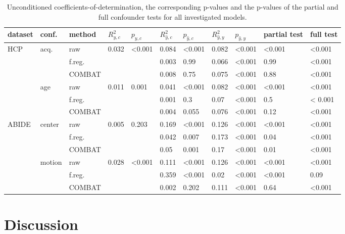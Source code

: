 \documentclass{article}
\begin{document}
\renewcommand{\arraystretch}{1.2}
\begin{table}
\centering
\begin{tabular}{lll|ll|ll|ll|ll} 
dataset & conf. & method & $R^2_{y, c}$ & $p_{y, c}$ & $R^2_{\hat{y}, c}$ & $p_{\hat{y}, c}$ & $R^2_{\hat{y}, y}$ & $p_{\hat{y}, y}$ & partial test & full test  \\
\hline
HCP & acq.  & raw      & 0.032 & <0.001 & 0.084 & <0.001  & 0.082 & <0.001 & <0.001 & <0.001 \\
    &              & f.reg.    & & &0.003 & 0.99 & 0.066  & <0.001  & 0.99 & <0.001 \\
    &              & COMBAT    & & &0.008 & 0.75 & 0.075  & <0.001  & 0.88 & <0.001\\
\hline
    & age   & raw       & 0.011 & 0.001  & 0.041 & <0.001  & 0.082  & <0.001 & <0.001 & <0.001 \\
    &       & f.reg.    & & &0.001 & 0.3 & 0.07  & <0.001  & 0.5 & <    0.001 \\
    &       & COMBAT    & & &0.004 & 0.055 & 0.076 & <0.001 & 0.12 & <0.001 \\
\hline
ABIDE   & center   & raw       & 0.005  & 0.203 &  0.169 & <0.001& 0.126     & <0.001 & <0.001 & <0.001 \\
        &          & f.reg.    &  & &  0.042 & 0.007 & 0.173     & <0.001 & 0.04 & <0.001 \\
        &          & COMBAT    &  & &  0.05 & 0.001 & 0.17     & <0.001 & 0.01 & <0.001 \\
\hline
        & motion   & raw       & 0.028 & <0.001 & 0.111    &  <0.001 & 0.126    & <0.001 & <0.001& <0.001 \\
        &          & f.reg.    & & & 0.359    & <0.001  & 0.02   & <0.001 & <0.001 & 0.09 \\
        &          & COMBAT    & & &  0.002 & 0.202 & 0.111     & <0.001 & 0.64 & <0.001 \\
    

\end{tabular}
\caption{\label{tab:unconditional-pvals} Unconditioned coefficients-of-determination, the corresponding p-values and the p-values of the partial and full confounder tests for all investigated models.}
\end{table}

\section{Discussion}
\end{document}

